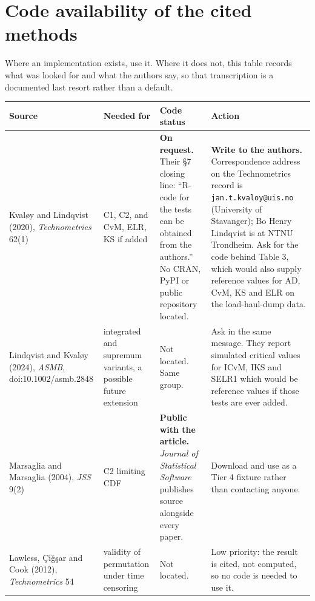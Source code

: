 \documentclass[11pt,a4paper]{article}
\begin{document}
\section{Code availability of the cited methods}
\label{sec:codestatus}

Where an implementation exists, use it. Where it does not, this table records what was
looked for and what the authors say, so that transcription is a documented last resort
rather than a default.

\begin{center}
\small
\setlength{\tabcolsep}{4pt}
\begin{tabular}{@{}>{\raggedright\arraybackslash}p{}
                 >{\raggedright\arraybackslash}p{}
                 >{\raggedright\arraybackslash}p{}
                 >{\raggedright\arraybackslash}p{}@{}}
\toprule
\textbf{Source} & \textbf{Needed for} & \textbf{Code status} & \textbf{Action}\\
\midrule
Kvaløy and Lindqvist (2020), \emph{Technometrics} 62(1) &
C1, C2, and CvM, ELR, KS if added &
\textbf{On request.} Their \S 7 closing line: \enquote{R-code for the tests can be
obtained from the authors.} No CRAN, PyPI or public repository located. &
\textbf{Write to the authors.} Correspondence address on the Technometrics record is
\texttt{jan.t.kvaloy@uis.no} (University of Stavanger); Bo Henry Lindqvist is at NTNU
Trondheim. Ask for the code behind Table 3, which would also supply reference values for
AD, CvM, KS and ELR on the load-haul-dump data.\\[3pt]

Lindqvist and Kvaløy (2024), \emph{ASMB}, doi:10.1002/asmb.2848 &
integrated and supremum variants, a possible future extension &
Not located. Same group. &
Ask in the same message. They report simulated critical values for ICvM, IKS and SELR1
which would be reference values if those tests are ever added.\\[3pt]

Marsaglia and Marsaglia (2004), \emph{JSS} 9(2) &
C2 limiting CDF &
\textbf{Public with the article.} \emph{Journal of Statistical Software} publishes source
alongside every paper. &
Download and use as a Tier 4 fixture rather than contacting anyone.\\[3pt]

Lawless, Çiğşar and Cook (2012), \emph{Technometrics} 54 &
validity of permutation under time censoring &
Not located. &
Low priority: the result is cited, not computed, so no code is needed to use it.\\[3pt]


\end{tabular}
\end{center}
\end{document}

